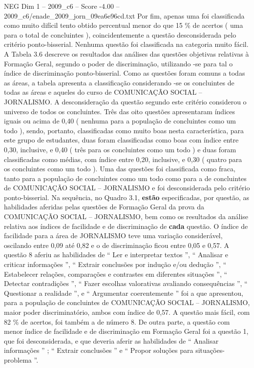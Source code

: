 \begin{textsample}{NEG Dim 1 – 2009\_c6 – Score -4.00 – 2009\_c6/enade\_2009\_jorn\_09ea6e96cd.txt}
Por fim, apenas uma foi classificada como muito difícil tento obtido percentual menor do que 15 \% de acertos ( uma para o total de concluintes ), coincidentemente a questão desconsiderada pelo critério ponto-bisserial.
Nenhuma questão foi classificada na categoria muito fácil.
A Tabela 3.6 descreve os resultados das análises das questões objetivas relativas à Formação Geral, segundo o poder de discriminação, utilizando -se para tal o índice de discriminação ponto-bisserial.
Como as questões foram comuns a todas as áreas, a tabela apresenta a classificação considerando -se os concluintes de todas as áreas e aqueles do curso de COMUNICAÇÃO SOCIAL – JORNALISMO.
A desconsideração da questão segundo este critério considerou o universo de todos os concluintes.
Três das oito questões apresentaram índices iguais ou acima de 0,40 ( nenhuma para a população de concluintes como um todo ), sendo, portanto, classificadas como muito boas nesta característica, para este grupo de estudantes, duas foram classificadas como boas com índice entre 0,30, inclusive, e 0,40 ( três para os concluintes como um todo ) e duas foram classificadas como médias, com índice entre 0,20, inclusive, e 0,30 ( quatro para os concluintes como um todo ).
Uma das questões foi classificada como fraca, tanto para a população de concluintes como um todo como para a de concluintes de COMUNICAÇÃO SOCIAL – JORNALISMO e foi desconsiderada pelo critério ponto-bisserial.
Na sequência, no Quadro 3.1, \textbf{estão} especificadas, por questão, as habilidades aferidas pelas questões de Formação Geral da prova da COMUNICAÇÃO SOCIAL – JORNALISMO, bem como os resultados da análise relativa aos índices de facilidade e de discriminação de \textbf{cada} questão.
O índice de facilidade para a área de JORNALISMO teve uma variação considerável, oscilando entre 0,09 até 0,82 e o de discriminação ficou entre 0,05 e 0,57.
A questão 8 aferiu as habilidades de “ Ler e interpretar textos ”, “ Analisar e criticar informações ”, “ Extrair conclusões por indução e/ou dedução ”, “ Estabelecer relações, comparações e contrastes em diferentes situações ”, “ Detectar contradições ”, “ Fazer escolhas valorativas avaliando consequências ”, “ Questionar a realidade ”, e “ Argumentar coerentemente ” foi a que apresentou, para a população de concluintes de COMUNICAÇÃO SOCIAL – JORNALISMO, maior poder discriminatório, ambos com índice de 0,57.
A questão mais fácil, com 82 \% de acertos, foi também a de número 8.
De outra parte, a questão com menor índice de facilidade e de discriminação em Formação Geral foi a questão 1, que foi desconsiderada, e que deveria aferir as habilidades de “ Analisar informações ” ; “ Extrair conclusões ” e “ Propor soluções para situações-problema ”.

\end{textsample}
